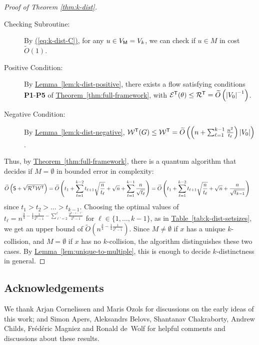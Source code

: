 \documentclass{theoretics}
\newcommand{\eq}[1]{\hyperref[eq:#1]{(\ref*{eq:#1})}}
\newcommand{\thm}[1]{\hyperref[thm:#1]{Theorem~\ref*{thm:#1}}}
\newcommand{\lem}[1]{\hyperref[lem:#1]{Lemma~\ref*{lem:#1}}}
\newcommand{\tabl}[1]{\hyperref[tab:#1]{Table~\ref*{tab:#1}}}
\renewcommand{\>}{\rangle}
\newcommand{\<}{\langle}
\renewcommand{\(}{\left(}
\renewcommand{\)}{\right)}
\def\abs#1{\left| #1 \right|}
\begin{document}
\begin{proof}[Proof of Theorem \ref{thm:k-dist}]
\begin{description}
		\item[Checking Subroutine:] By \eq{k-dist-C}, for any $u\in V_{\sf M}=V_k$, we can check if $u\in M$ in cost $\widetilde{O}(1)$. 
		\item[Positive Condition:] By \lem{k-dist-positive}, there exists a flow satisfying conditions \textbf{P1}-\textbf{P5} of \thm{full-framework}, with ${\cal E}^{\sf T}(\theta)\leq {\cal R}^{\sf T}=\widetilde{O}\left(\abs{V_0}^{-1} \right)$. 
		\item[Negative Condition:] By \lem{k-dist-negative}, ${\cal W}^{\sf T}(G)\leq {\cal W}^{\sf T}=\widetilde{O}\left(\left(n  + \sum_{\ell=1}^{k-1} \frac{n^2}{t_{\ell}}\right)\abs{V_0}\right)$. 
	\end{description}
	Thus, by \thm{full-framework}, there is a quantum algorithm that decides if $M=\emptyset$ in bounded error in complexity:
	\begin{align*}
		\widetilde{O}\left({\sf S}+\sqrt{{\cal R}^{\sf T}{\cal W}^{\sf T}}\right) &
=\widetilde{O}\left(t_1+\sum_{\ell=1}^{k-2}t_{\ell+1}\sqrt{\frac{n}{t_{\ell}}}+\sqrt{n} + \sum_{\ell=1}^{k-1}\frac{n}{\sqrt{t_{\ell}}}\right)
=\widetilde{O}\left(t_1+\sum_{\ell=1}^{k-2}t_{\ell+1}\sqrt{\frac{n}{t_{\ell}}}+\sqrt{n} + \frac{n}{\sqrt{t_{k-1}}}\right)
	\end{align*}
since $t_1>t_2>\dots>t_{k-1}$.
Choosing the optimal values of $t_{\ell} = n^{\frac{3}{4}-\frac{1}{4}\frac{1}{2^k-1} - \sum_{\ell'=2}^{\ell}\frac{2^{k-1-\ell'}}{2^k-1}}$ for $\ell \in \{1,\dots,k-1\}$, as in \tabl{k-dist-setsizes}, we get an upper bound of $\widetilde{O}\left(n^{\frac{3}{4}-\frac{1}{4}\frac{1}{2^k-1}}\right)$.
Since $M\neq\emptyset$ if $x$ has a unique $k$-collision, and $M=\emptyset$ if $x$ has no $k$-collision, the algorithm distinguishes these two cases. By \lem{unique-to-multiple}, this is enough to decide $k$-distinctness in general.
\end{proof}



\subsection*{Acknowledgements}

We thank Arjan Cornelissen and Maris Ozols for discussions on the early ideas of this work; and Simon Apers, Aleksandrs Belovs, Shantanav Chakraborty, Andrew Childs, Fr\'ed\'eric Magniez
and Ronald de~Wolf for helpful comments and discussions about these results.

\newpage 

\printbibliography
\end{document}
